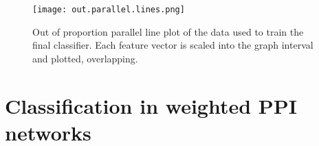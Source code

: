 \begin{figure}
    \texttt{[image: out.parallel.lines.png]}   
    \centering
    \caption{Out of proportion parallel line plot of the data used to train the final classifier. Each feature vector is scaled into the graph interval and plotted, overlapping.}
    \label{fig:outparline}
\end{figure}

%
%
%

\section{Classification in weighted PPI networks}

